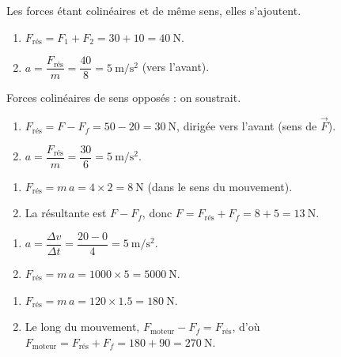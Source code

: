 \documentclass[11pt,a4paper]{article}
\newcommand{\vv}[1]{\vec{#1}}\newcommand{\ds}{\displaystyle}
\begin{document}

\begin{corrige}
Les forces étant colinéaires et de même sens, elles s'ajoutent.
\begin{enumerate}[label=\alph*)]
  \item $F_{\text{rés}}=F_1+F_2=30+10=\qty{40}{\newton}$.
  \item $a=\dfrac{F_{\text{rés}}}{m}=\dfrac{40}{8}=\qty{5}{\metre\per\second\squared}$ (vers l'avant).
\end{enumerate}
\end{corrige}

\begin{corrige}
Forces colinéaires de sens opposés : on soustrait.
\begin{enumerate}[label=\alph*)]
  \item $F_{\text{rés}}=F-F_f=50-20=\qty{30}{\newton}$, dirigée vers l'avant (sens de $\vv F$).
  \item $a=\dfrac{F_{\text{rés}}}{m}=\dfrac{30}{6}=\qty{5}{\metre\per\second\squared}$.
\end{enumerate}
\end{corrige}

\begin{corrige}
\begin{enumerate}[label=\alph*)]
  \item $F_{\text{rés}}=m\,a=4\times 2=\qty{8}{\newton}$ (dans le sens du mouvement).
  \item La résultante est $F-F_f$, donc $F=F_{\text{rés}}+F_f=8+5=\qty{13}{\newton}$.
\end{enumerate}
\end{corrige}

\begin{corrige}
\begin{enumerate}[label=\alph*)]
  \item $a=\dfrac{\Delta v}{\Delta t}=\dfrac{20-0}{4}=\qty{5}{\metre\per\second\squared}$.
  \item $F_{\text{rés}}=m\,a=1000\times 5=\qty{5000}{\newton}$.
\end{enumerate}
\end{corrige}

\begin{corrige}
\begin{enumerate}[label=\alph*)]
  \item $F_{\text{rés}}=m\,a=120\times\num{1,5}=\qty{180}{\newton}$.
  \item Le long du mouvement, $F_{\text{moteur}}-F_f=F_{\text{rés}}$, d'où
        $F_{\text{moteur}}=F_{\text{rés}}+F_f=180+90=\qty{270}{\newton}$.
\end{enumerate}
\end{corrige}
\end{document}
